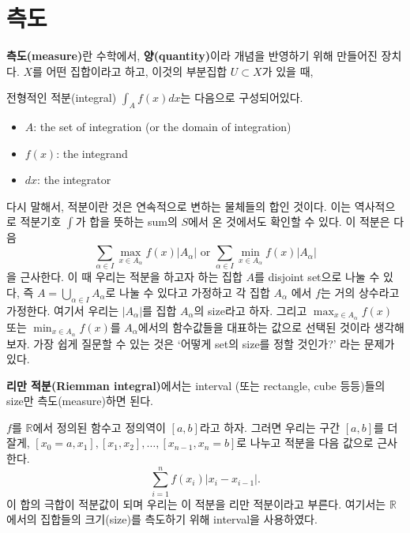 \documentclass[b5paper,]{scrbook}
\theoremstyle{plain}
\theoremstyle{definition}
\numberwithin{equation}{section}
\let\BeginKnitrBlock\begin \let\EndKnitrBlock\end
\begin{document}
\chapter{측도}\label{measure}

\textbf{측도(measure)}란 수학에서, \textbf{양(quantity)}이라 개념을
반영하기 위해 만들어진 장치다. \(X\)를 어떤 집합이라고 하고, 이것의
부분집합 \(U \subset X\)가 있을 때,

전형적인 적분(integral) \(\int_{A}f(x)dx\)는 다음으로 구성되어있다.

\begin{itemize}
\item
  \(A\): the set of integration (or the domain of integration)
\item
  \(f(x)\): the integrand
\item
  \(dx\): the integrator
\end{itemize}

다시 말해서, 적분이란 것은 연속적으로 변하는 물체들의 합인 것이다. 이는
역사적으로 적분기호 \(\int\)가 합을 뜻하는 sum의 \(S\)에서 온 것에서도
확인할 수 있다. 이 적분은 다음
\[\sum_{\alpha\in I}\max_{x\in A_{\alpha}}f(x)|A_{\alpha}| \text{ or } \sum_{\alpha\in I}\min_{x\in A_{\alpha}}f(x)|A_{\alpha}|\]
을 근사한다. 이 때 우리는 적분을 하고자 하는 집합 \(A\)를 disjoint
set으로 나눌 수 있다, 즉 \(A=\bigcup_{\alpha\in I}A_{\alpha}\)로 나눌 수
있다고 가정하고 각 집합 \(A_{\alpha}\) 에서 \(f\)는 거의 상수라고
가정한다. 여기서 우리는 \(|A_{\alpha}|\)를 집합 \(A_{\alpha}\)의
size라고 하자. 그리고 \(\max_{x\in A_{\alpha}}f(x)\) 또는
\(\min_{x\in A_{\alpha}}f(x)\)를 \(A_{\alpha}\)에서의 함수값들을
대표하는 값으로 선택된 것이라 생각해보자. 가장 쉽게 질문할 수 있는 것은
`어떻게 set의 size를 정할 것인가?' 라는 문제가 있다.

\textbf{리만 적분(Riemman integral)}에서는 interval (또는 rectangle,
cube 등등)들의 size만 측도(measure)하면 된다.

\BeginKnitrBlock{example}[정의역과 치역이 1차원인 함수에서의 리만 적분]
\protect\hypertarget{exm:unnamed-chunk-33}{}{\label{exm:unnamed-chunk-33}
{} }\(f\)를
\(\mathbb{R}\)에서 정의된 함수고 정의역이 \([a,b]\)라고 하자. 그러면
우리는 구간 \([a,b]\)를 더 잘게,
\([x_{0}=a,x_{1}], [x_{1},x_{2}],\ldots, [x_{n-1},x_{n}=b]\)로 나누고
적분을 다음 값으로 근사한다. \[\sum_{i=1}^{n}f(x_{i})|x_{i}-x_{i-1}|.\]
이 합의 극합이 적분값이 되며 우리는 이 적분을 리만 적분이라고 부른다.
여기서는 \(\mathbb{R}\)에서의 집합들의 크기(size)를 측도하기 위해
interval을 사용하였다.
\EndKnitrBlock{example}
\end{document}
